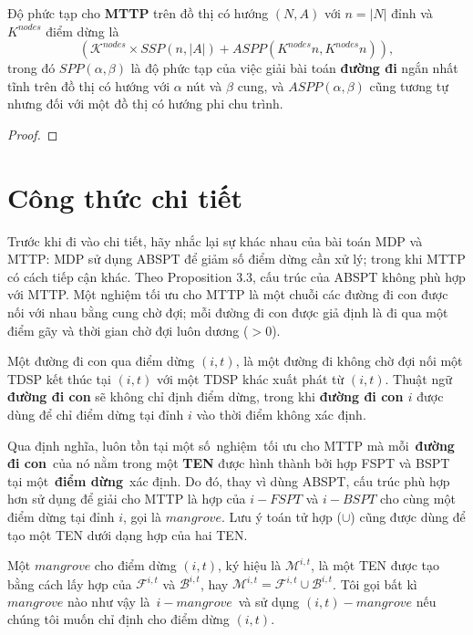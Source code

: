 \documentclass[../main.tex]{subfiles}
\begin{document}
\begin{proposition}
\label{prp:dpt-mttp}
Độ phức tạp cho \textbf{MTTP} trên đồ thị
có hướng \((N,A)\) với \(n = |N|\) đỉnh và \(K^{nodes}\) điểm dừng là
\[ (\mathcal{K}^{nodes} ×SSP(n,|A|)+ASPP(K^{nodes}n,K^{nodes}n)), \]
trong đó \(SPP(\alpha,\beta)\) là độ phức tạp của việc giải bài toán
\textbf{đường đi} ngắn nhất tĩnh trên đồ thị có hướng với \(\alpha\) nút
và \(\beta\) cung, và \(ASPP(\alpha,\beta)\) cũng tương tự nhưng đối với
một đồ thị có hướng phi chu trình.
\end{proposition}

\begin{proof} \end{proof}

\section{Công thức chi tiết}\label{cong-thuc2}

Trước khi đi vào chi tiết, hãy nhắc lại sự khác nhau của bài toán MDP và
MTTP: MDP sử dụng ABSPT để giảm số điểm dừng cần xử lý; trong khi MTTP
có cách tiếp cận khác. Theo Proposition 3.3, cấu trúc của ABSPT không
phù hợp với MTTP. Một nghiệm tối ưu cho MTTP là một chuỗi các đường đi
con được nối với nhau bằng cung chờ đợi; mỗi đường đi con được giả định
là đi qua một điểm gãy và thời gian chờ đợi luôn dương (\(>0\)).

\begin{definition}
\label{def:duong-di-con}
Một đường đi con qua điểm
dừng \((i, t)\), là một đường đi không chờ đợi nối một TDSP kết thúc tại
\((i, t)\) với một TDSP khác xuất phát từ \((i, t)\). Thuật ngữ
\textbf{đường đi con} sẽ không chỉ định điểm dừng, trong khi
\textbf{đường đi con \(i\)} được dùng để chỉ điểm dừng tại đỉnh \(i\)
vào thời điểm không xác định.
\end{definition}

Qua định nghĩa, luôn tồn tại một số~nghiệm~tối ưu cho MTTP mà
mỗi~\textbf{đường đi con}~của nó nằm trong một \textbf{TEN} được hình
thành bởi hợp FSPT và BSPT tại một~\textbf{điểm dừng}~xác định. Do đó,
thay vì dùng ABSPT, cấu trúc phù hợp hơn sử dụng để giải cho MTTP là hợp
của \(i-FSPT\) và \(i-BSPT\) cho cùng một điểm dừng tại đỉnh \(i\), gọi
là \(mangrove\). Lưu ý toán tử hợp (\(\cup\)) cũng được dùng để tạo một
TEN dưới dạng hợp của hai TEN.

\begin{definition}
\label{def:mangrove}
Một \(mangrove\) cho điểm dừng \((i, t)\), ký
hiệu là \(\mathcal M ^{i,t}\), là một TEN được tạo bằng cách lấy hợp của
\(\mathcal F^{i,t}\) và \(\mathcal B ^{i,t}\), hay
\(\mathcal M ^{i,t} = \mathcal F ^{i,t} \cup \mathcal B ^{i,t}\). Tôi gọi bất kì
\(mangrove\) nào như vậy là~\(i-mangrove\)~và sử dụng
\((i, t)-mangrove\) nếu chúng tôi muốn chỉ định cho điểm dừng
\((i, t)\).
\end{definition}
\end{document}
